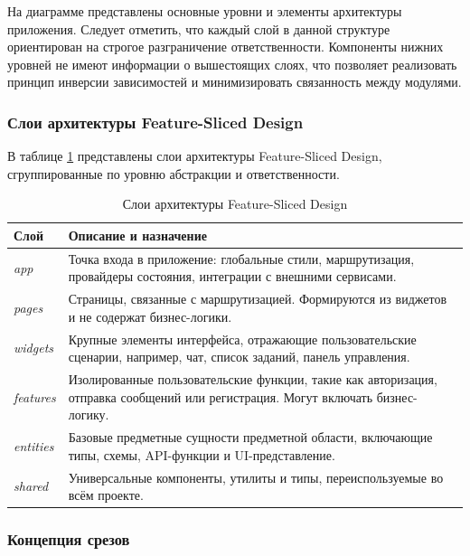 На диаграмме представлены основные уровни и элементы архитектуры приложения. Следует отметить, что каждый слой в данной структуре ориентирован на строгое разграничение ответственности. Компоненты нижних уровней не имеют информации о вышестоящих слоях, что позволяет реализовать принцип инверсии зависимостей и минимизировать связанность между модулями.

\subsubsection{Слои архитектуры Feature-Sliced Design}

В таблице \ref{tab:fsd-layers} представлены слои архитектуры Feature-Sliced Design, сгруппированные по уровню абстракции и ответственности.

\begin{table}[h]
  \centering
  \caption{Слои архитектуры Feature-Sliced Design}
  \label{tab:fsd-layers}
  \begin{tabular}{|p{3cm}|p{11cm}|}
    \hline
    \textbf{Слой} & \textbf{Описание и назначение} \\ \hline
    \textit{app}      & Точка входа в приложение: глобальные стили, маршрутизация, провайдеры состояния, интеграции с внешними сервисами. \\ \hline
    \textit{pages}    & Страницы, связанные с маршрутизацией. Формируются из виджетов и не содержат бизнес-логики. \\ \hline
    \textit{widgets}  & Крупные элементы интерфейса, отражающие пользовательские сценарии, например, чат, список заданий, панель управления. \\ \hline
    \textit{features}& Изолированные пользовательские функции, такие как авторизация, отправка сообщений или регистрация. Могут включать бизнес-логику. \\ \hline
    \textit{entities} & Базовые предметные сущности предметной области, включающие типы, схемы, API-функции и UI-представление. \\ \hline
    \textit{shared}   & Универсальные компоненты, утилиты и типы, переиспользуемые во всём проекте. \\ \hline
  \end{tabular}
\end{table}

\subsubsection{Концепция срезов}

